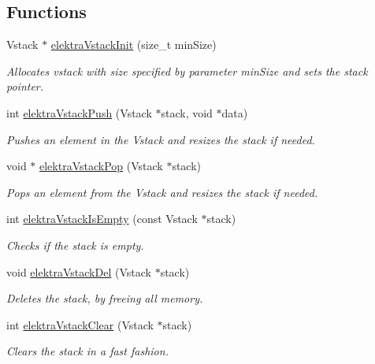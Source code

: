 \subsection*{Functions}
\begin{DoxyCompactItemize}
\item 
Vstack $\ast$ \hyperlink{group__vstack_gad83493ea84a33554d53e35b5e5f85ffb}{elektra\+Vstack\+Init} (size\+\_\+t min\+Size)
\begin{DoxyCompactList}\small\item\em Allocates vstack with size specified by parameter min\+Size and sets the stack pointer. \end{DoxyCompactList}\item 
int \hyperlink{group__vstack_ga483ad909ca55b5757e3fe6e05c5ee240}{elektra\+Vstack\+Push} (Vstack $\ast$stack, void $\ast$data)
\begin{DoxyCompactList}\small\item\em Pushes an element in the Vstack and resizes the stack if needed. \end{DoxyCompactList}\item 
void $\ast$ \hyperlink{group__vstack_ga311785195ba8ee03ba8e7f953a5c772e}{elektra\+Vstack\+Pop} (Vstack $\ast$stack)
\begin{DoxyCompactList}\small\item\em Pops an element from the Vstack and resizes the stack if needed. \end{DoxyCompactList}\item 
int \hyperlink{group__vstack_gae2eb7657a51c430a63f64d754336db0b}{elektra\+Vstack\+Is\+Empty} (const Vstack $\ast$stack)
\begin{DoxyCompactList}\small\item\em Checks if the stack is empty. \end{DoxyCompactList}\item 
\hypertarget{group__vstack_gafc0a720e64b0185732a2517665fb97f2}{void \hyperlink{group__vstack_gafc0a720e64b0185732a2517665fb97f2}{elektra\+Vstack\+Del} (Vstack $\ast$stack)}\label{group__vstack_gafc0a720e64b0185732a2517665fb97f2}

\begin{DoxyCompactList}\small\item\em Deletes the stack, by freeing all memory. \end{DoxyCompactList}\item 
int \hyperlink{group__vstack_ga486d83054a50b723f90ac6bf74f94abc}{elektra\+Vstack\+Clear} (Vstack $\ast$stack)
\begin{DoxyCompactList}\small\item\em Clears the stack in a fast fashion. \end{DoxyCompactList}\end{DoxyCompactItemize}


